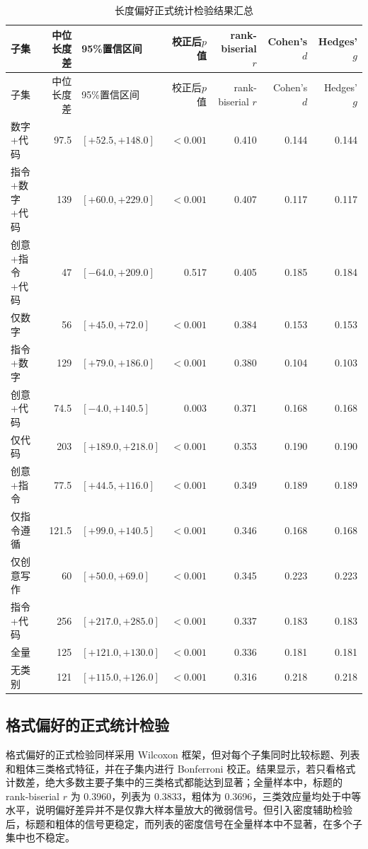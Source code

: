 \documentclass[9pt,a4paper,fontset=windows]{ctexart}
\theoremstyle{definition}
\numberwithin{equation}{section}
\begin{document}
\begin{longtable}{lrlrrrr}
\caption{长度偏好正式统计检验结果汇总}\\
\toprule
子集 & 中位长度差 & 95\%置信区间 & 校正后\(p\)值 & rank-biserial \(r\) & Cohen's \(d\) & Hedges' \(g\) \\
\midrule
\endfirsthead
\toprule
子集 & 中位长度差 & 95\%置信区间 & 校正后\(p\)值 & rank-biserial \(r\) & Cohen's \(d\) & Hedges' \(g\) \\
\midrule
\endhead
数字+代码 & 97.5 & \([+52.5,+148.0]\) & \(<0.001\) & 0.410 & 0.144 & 0.144 \\
指令+数字+代码 & 139 & \([+60.0,+229.0]\) & \(<0.001\) & 0.407 & 0.117 & 0.117 \\
创意+指令+代码 & 47 & \([-64.0,+209.0]\) & 0.517 & 0.405 & 0.185 & 0.184 \\
仅数字 & 56 & \([+45.0,+72.0]\) & \(<0.001\) & 0.384 & 0.153 & 0.153 \\
指令+数字 & 129 & \([+79.0,+186.0]\) & \(<0.001\) & 0.380 & 0.104 & 0.103 \\
创意+代码 & 74.5 & \([-4.0,+140.5]\) & 0.003 & 0.371 & 0.168 & 0.168 \\
仅代码 & 203 & \([+189.0,+218.0]\) & \(<0.001\) & 0.353 & 0.190 & 0.190 \\
创意+指令 & 77.5 & \([+44.5,+116.0]\) & \(<0.001\) & 0.349 & 0.189 & 0.189 \\
仅指令遵循 & 121.5 & \([+99.0,+140.5]\) & \(<0.001\) & 0.346 & 0.168 & 0.168 \\
仅创意写作 & 60 & \([+50.0,+69.0]\) & \(<0.001\) & 0.345 & 0.223 & 0.223 \\
指令+代码 & 256 & \([+217.0,+285.0]\) & \(<0.001\) & 0.337 & 0.183 & 0.183 \\
全量 & 125 & \([+121.0,+130.0]\) & \(<0.001\) & 0.336 & 0.181 & 0.181 \\
无类别 & 121 & \([+115.0,+126.0]\) & \(<0.001\) & 0.316 & 0.218 & 0.218 \\
\bottomrule
\end{longtable}

\subsection{格式偏好的正式统计检验}
格式偏好的正式检验同样采用 Wilcoxon 框架，但对每个子集同时比较标题、列表和粗体三类格式特征，并在子集内进行 Bonferroni 校正。结果显示，若只看格式计数差，绝大多数主要子集中的三类格式都能达到显著；全量样本中，标题的 rank-biserial \(r\) 为 0.3960，列表为 0.3833，粗体为 0.3696，三类效应量均处于中等水平，说明偏好差异并不是仅靠大样本量放大的微弱信号。但引入密度辅助检验后，标题和粗体的信号更稳定，而列表的密度信号在全量样本中不显著，在多个子集中也不稳定。
\end{document}
